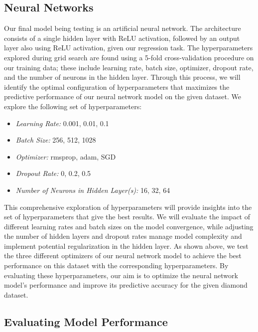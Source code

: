 \documentclass[conference]{IEEEtran}
\begin{document}
\subsection{Neural Networks}

Our final model being testing is an artificial neural network. The architecture consists of a single hidden layer with ReLU activation, followed by an output layer also using ReLU activation, given our regression task. The hyperparameters explored during grid search are found using a 5-fold cross-validation procedure on our training data; these include learning rate, batch size, optimizer, dropout rate, and the number of neurons in the hidden layer. Through this process, we will identify the optimal configuration of hyperparameters that maximizes the predictive performance of our neural network model on the given dataset. We explore the following set of hyperparameters:

\begin{itemize}
    \item \emph{Learning Rate:} 0.001, 0.01, 0.1
    \item \emph{Batch Size:} 256, 512, 1028
    \item \emph{Optimizer:} rmsprop, adam, SGD
    \item \emph{Dropout Rate:} 0, 0.2, 0.5
    \item \emph{Number of Neurons in Hidden Layer(s):} 16, 32, 64
\end{itemize}

This comprehensive exploration of hyperparameters will provide insights into the set of hyperparameters that give the best results. We will evaluate the impact of different learning rates and batch sizes on the model convergence, while adjusting the number of hidden layers and dropout rates manage model complexity and implement potential regularization in the hidden layer. As shown above, we test the three different optimizers of our neural network model to achieve the best performance on this dataset with the corresponding hyperparameters. By evaluating these hyperparameters, our aim is to optimize the neural network model's performance and improve its predictive accuracy for the given diamond dataset.

\subsection{Evaluating Model Performance}
\end{document}
